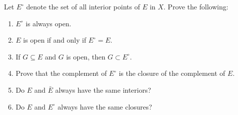   \begin{exercise}[Rudin 2.9]
    Let $E^\circ$ denote the set of all interior points of $E$ in $X$. Prove the following:
    \begin{enumerate}
      \item[(a)] $E^\circ$ is always open.
      \item[(b)] $E$ is open if and only if $E^\circ = E$.
      \item[(c)] If $G \subseteq E$ and $G$ is open, then $G \subset E^\circ$.
      \item[(d)] Prove that the complement of $E^\circ$ is the closure of the complement of $E$. 
      \item[(e)] Do $E$ and $\bar{E}$ always have the same interiors? 
      \item[(f)] Do $E$ and $E^\circ$ always have the same closures? 
    \end{enumerate}
  \end{exercise}
